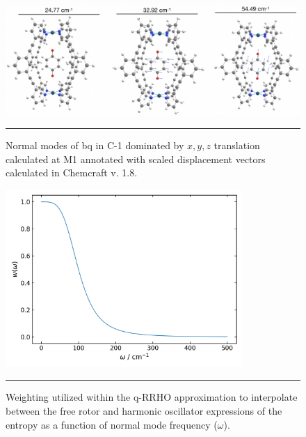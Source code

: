 \documentclass[../../main.tex]{subfiles}
\begin{document}
\begin{figure}[h!]
	\vspace{0.4cm}
	\centering
	\includegraphics[width=\textwidth]{3/da//figs/figS12}
	\vspace{0.2cm}
	\hrule
	\caption{Normal modes of bq in C-1 dominated by $x, y, z$ translation calculated at M1 annotated with scaled displacement vectors calculated in Chemcraft v. 1.8.}
	\label{fig::si_da_12}
\end{figure}

\begin{figure}[h!]
	\vspace{0.4cm}
	\centering
	\includegraphics[width=9cm]{3/da//figs/figS13}
	\vspace{0.2cm}
	\hrule
	\caption{Weighting utilized within the q-RRHO approximation to interpolate between the free rotor and harmonic oscillator expressions of the entropy as a function of normal mode frequency ($\omega$).}
	\label{fig::si_da_13}
\end{figure}
\end{document}
